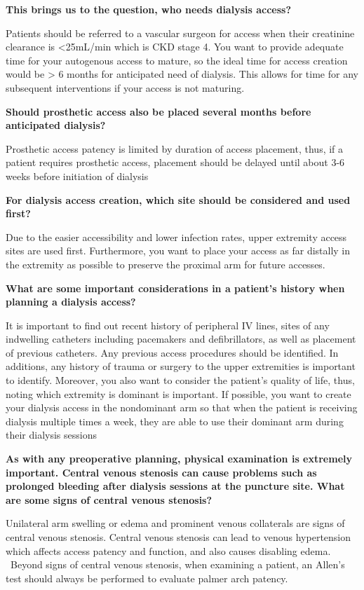 \documentclass[
]{book}
\begin{document}
\textbf{This brings us to the question, who needs dialysis access?}

Patients should be referred to a vascular surgeon for access when their
creatinine clearance is \textless25mL/min which is CKD stage 4. You want to
provide adequate time for your autogenous access to mature, so the ideal
time for access creation would be \textgreater{} 6 months for anticipated need of
dialysis. This allows for time for any subsequent interventions if your
access is not maturing.

\textbf{Should prosthetic access also be placed several months before
anticipated dialysis?}

Prosthetic access patency is limited by duration of access placement,
thus, if a patient requires prosthetic access, placement should be
delayed until about 3-6 weeks before initiation of dialysis

\textbf{For dialysis access creation, which site should be considered and used
first?}

Due to the easier accessibility and lower infection rates, upper
extremity access sites are used first. Furthermore, you want to place
your access as far distally in the extremity as possible to preserve the
proximal arm for future accesses.

\textbf{What are some important considerations in a patient's history when
planning a dialysis access?}

It is important to find out recent history of peripheral IV lines, sites
of any indwelling catheters including pacemakers and defibrillators, as
well as placement of previous catheters. Any previous access procedures
should be identified. In additions, any history of trauma or surgery to
the upper extremities is important to identify. Moreover, you also want
to consider the patient's quality of life, thus, noting which extremity
is dominant is important. If possible, you want to create your dialysis
access in the nondominant arm so that when the patient is receiving
dialysis multiple times a week, they are able to use their dominant arm
during their dialysis sessions

\textbf{As with any preoperative planning, physical examination is extremely
important. Central venous stenosis can cause problems such as prolonged
bleeding after dialysis sessions at the puncture site. What are some
signs of central venous stenosis?}

Unilateral arm swelling or edema and prominent venous collaterals are
signs of central venous stenosis. Central venous stenosis can lead to
venous hypertension which affects access patency and function, and also
causes disabling edema. ~Beyond signs of central venous stenosis, when
examining a patient, an Allen's test should always be performed to
evaluate palmer arch patency.
\end{document}
